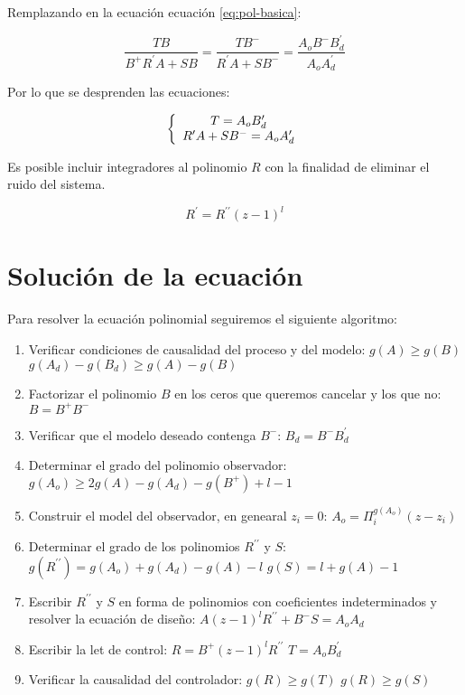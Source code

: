 Remplazando en la ecuación ecuación \ref{eq:pol-basica}:

\begin{equation}
    \frac{TB}{B^+R^\prime A+SB} = \frac{TB^-}{R^\prime A + SB^-} = \frac{A_oB^-B^\prime_d}{A_oA^\prime_d}
\end{equation}

Por lo que se desprenden las ecuaciones: 

\begin{equation}
    \left\{ \begin{array}{c} 
        T = A_oB^\prime_d \\ 
        R^\prime A + SB^- = A_oA^\prime_d
     \end{array} \right.
\end{equation}

Es posible incluir integradores al polinomio $R$ con la finalidad de eliminar el ruido del sistema.

\begin{equation}
    R^\prime = R^{\prime\prime}(z-1)^l
\end{equation}

\section{Solución de la ecuación}

Para resolver la ecuación polinomial seguiremos el siguiente algoritmo: 

\begin{enumerate}
    \item Verificar condiciones de causalidad del proceso y del modelo:
        \subitem $g(A)\geq g(B)$
        \subitem $g(A_d)-g(B_d) \geq g(A) - g(B)$
    \item Factorizar el polinomio $B$ en los ceros que queremos cancelar y los que no: 
        \subitem $B=B^+B^-$
    \item Verificar que el modelo deseado contenga $B^-$:
        \subitem $B_d=B^-B^\prime_d$
    \item Determinar el grado del polinomio observador: 
        \subitem $g(A_o) \geq 2g(A)-g(A_d) -g(B^+) + l -1$
    \item Construir el model del observador, en genearal $z_i=0$:
        \subitem $A_o=\Pi_i^{g(A_o)} (z-z_i)$
    \item Determinar el grado de los polinomios $R^{\prime\prime}$ y $S$:
        \subitem $g(R^{\prime\prime})=g(A_o)+g(A_d)-g(A)-l$
        \subitem $g(S)=l + g(A) - 1$
    \item Escribir $R^{\prime\prime}$ y $S$ en forma de polinomios con coeficientes 
    indeterminados y resolver la ecuación de diseño: 
        \subitem $A(z-1)^lR^{\prime\prime} + B^-S=A_oA_d$
    \item Escribir la let de control: 
        \subitem $R=B^+(z-1)^lR^{\prime\prime}$
        \subitem $T=A_oB^\prime_d$
    \item Verificar la causalidad del controlador: 
        \subitem $g(R) \geq g(T)$
        \subitem $g(R) \geq g(S)$
\end{enumerate}

